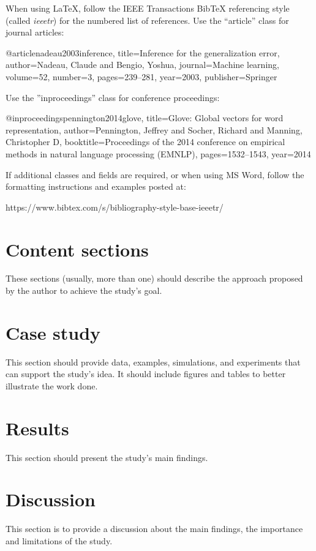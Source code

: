 \documentclass[12pt]{report}
\begin{document}
When using LaTeX, follow the IEEE Transactions BibTeX referencing style (called \textit{ieeetr}) for the numbered list of references. Use the “article” class for journal articles:
\begin{spverbatim}
@article{nadeau2003inference,
  title={Inference for the generalization error},
  author={Nadeau, Claude and Bengio, Yoshua},
  journal={Machine learning},
  volume={52},
  number={3},
  pages={239--281},
  year={2003},
  publisher={Springer}
}
\end{spverbatim}
\noindent Use the ”inproceedings” class for conference proceedings:
\begin{spverbatim}
  @inproceedings{pennington2014glove,
  title={Glove: Global vectors for word representation},
  author={Pennington, Jeffrey and Socher, Richard and Manning, Christopher D},
  booktitle={Proceedings of the 2014 conference on empirical methods in natural language processing (EMNLP)},
  pages={1532--1543},
  year={2014}
}
\end{spverbatim}

\bigskip
If additional classes and fields are required, or when using MS Word, follow the formatting instructions and examples posted at:

\noindent https://www.bibtex.com/s/bibliography-style-base-ieeetr/

\chapter{Content sections}
These sections (usually, more than one) should describe the approach proposed by the author to achieve the study’s goal.

\chapter{Case study}
This section should provide data, examples, simulations, and experiments that can support the study’s idea. It should include figures and tables to better illustrate the work done.

\chapter{Results}
This section should present the study’s main findings.

\chapter{Discussion}
This section is to provide a discussion about the main findings, the importance and limitations of the study.
\end{document}
